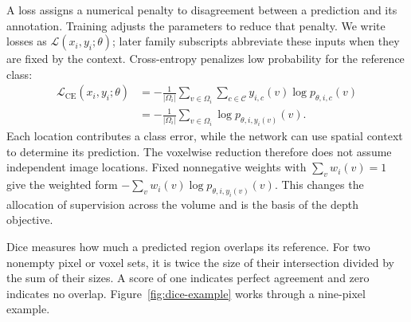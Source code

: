 \documentclass[12pt,a4paper]{article}
\begin{document}
A loss assigns a numerical penalty to disagreement between a prediction
and its annotation. Training adjusts the parameters to reduce that
penalty. We write losses as $\mathcal L(x_i,y_i;\theta)$; later family
subscripts abbreviate these inputs when they are fixed by the context.
Cross-entropy penalizes low probability for the reference class:
\begin{equation}
\begin{aligned}
\mathcal{L}_{\mathrm{CE}}(x_i,y_i;\theta)
&=-\frac{1}{|\Omega_i|}\sum_{v\in\Omega_i}
  \sum_{c\in\mathcal{C}}y_{i,c}(v)\log p_{\theta,i,c}(v)\\
&=-\frac{1}{|\Omega_i|}\sum_{v\in\Omega_i}
  \log p_{\theta,i,y_i(v)}(v).
\end{aligned}
\label{eq:cross-entropy}
\end{equation}
Each location contributes a class error, while the network can use spatial
context to determine its prediction. The voxelwise reduction therefore
does not assume independent image locations. Fixed nonnegative weights
with $\sum_v w_i(v)=1$ give the weighted form
$-\sum_v w_i(v)\log p_{\theta,i,y_i(v)}(v)$. This changes the allocation
of supervision across the volume and is the basis of the depth objective.

Dice measures how much a predicted region overlaps its reference.
For two nonempty pixel or voxel sets, it is twice the size of their
intersection divided by the sum of their sizes. A score of one indicates
perfect agreement and zero indicates no overlap.
Figure~\ref{fig:dice-example} works through a nine-pixel example.
\end{document}
